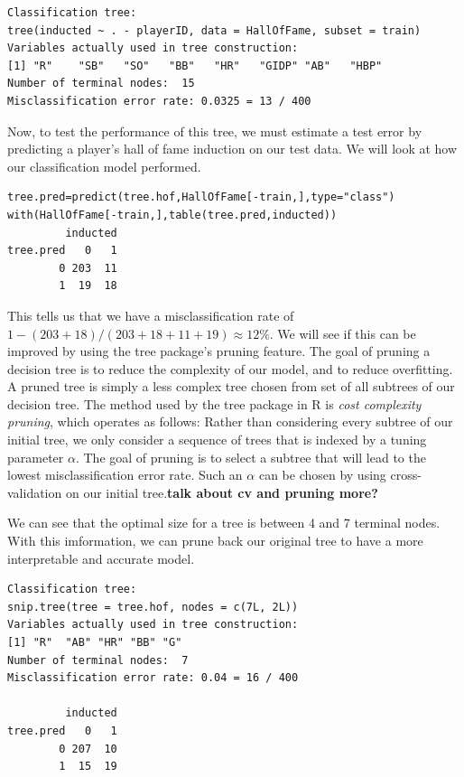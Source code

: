 \documentclass[preprint,12pt]{elsarticle}
\begin{document}
\begin{lstlisting}
Classification tree:
tree(inducted ~ . - playerID, data = HallOfFame, subset = train)
Variables actually used in tree construction:
[1] "R"    "SB"   "SO"   "BB"   "HR"   "GIDP" "AB"   "HBP" 
Number of terminal nodes:  15 
Misclassification error rate: 0.0325 = 13 / 400 
\end{lstlisting}


Now, to test the performance of this tree, we must estimate a test error by predicting a player's hall of fame induction on our test data. We will look at how our classification model performed.

\begin{lstlisting}
tree.pred=predict(tree.hof,HallOfFame[-train,],type="class")
with(HallOfFame[-train,],table(tree.pred,inducted))
         inducted
tree.pred   0   1
        0 203  11
        1  19  18
\end{lstlisting}

This tells us that we have a misclassification rate of $1-(203+18)/(203+18+11+19) \approx 12\%$. We will see if this can be improved by using the tree package's pruning feature. The goal of pruning a decision tree is to reduce the complexity of our model, and to reduce overfitting. A pruned tree is simply a less complex tree chosen from set of all subtrees of our decision tree. The method used by the tree package in R is \textit{cost complexity pruning}, which operates as follows: Rather than considering every subtree of our initial tree, we only consider a sequence of trees that is indexed by a tuning parameter $\alpha$. The goal of pruning is to select a subtree that will lead to the lowest misclassification error rate. Such an $\alpha$ can be chosen by using cross-validation on our initial tree.\textbf{talk about cv and pruning more?}



\noindent We can see that the optimal size for a tree is between 4 and 7 terminal nodes. With this imformation, we can prune back our original tree to have a more interpretable and accurate model.

\begin{lstlisting}
Classification tree:
snip.tree(tree = tree.hof, nodes = c(7L, 2L))
Variables actually used in tree construction:
[1] "R"  "AB" "HR" "BB" "G" 
Number of terminal nodes:  7 
Misclassification error rate: 0.04 = 16 / 400 

         inducted
tree.pred   0   1
        0 207  10
        1  15  19
\end{lstlisting}
\end{document}

